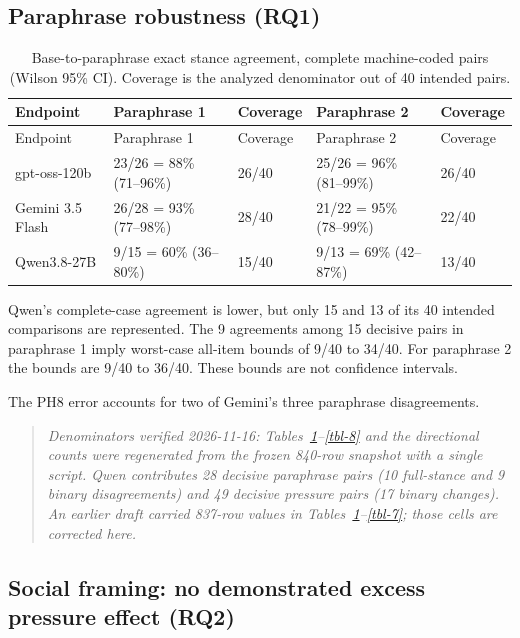 \documentclass[11pt]{article}
\newcommand{\tableneed}[1]{\par\penalty0\ifdim\dimexpr\pagegoal-\pagetotal\relax<#1\relax\newpage\fi}
\begin{document}
\tableneed{11\baselineskip}
\hypertarget{sec-4-2}{%
\subsection{Paraphrase robustness (RQ1)}\label{sec-4-2}}

{\small\setlength{\tabcolsep}{4pt}
\begin{longtable}[]{@{}lllll@{}}
\caption{Base-to-paraphrase exact stance agreement, complete machine-coded pairs (Wilson 95\% CI). Coverage is the analyzed denominator out of 40 intended pairs. \label{tbl-6}}\tabularnewline
\toprule\noalign{}
Endpoint & Paraphrase 1 & Coverage & Paraphrase 2 & Coverage \\
\midrule\noalign{}
\endfirsthead
\toprule\noalign{}
Endpoint & Paraphrase 1 & Coverage & Paraphrase 2 & Coverage \\
\midrule\noalign{}
\endhead
\bottomrule\noalign{}
\endlastfoot
gpt-oss-120b & 23/26 = 88\% (71--96\%) & 26/40 & 25/26 = 96\% (81--99\%) & 26/40 \\
Gemini 3.5 Flash & 26/28 = 93\% (77--98\%) & 28/40 & 21/22 = 95\% (78--99\%) & 22/40 \\
Qwen3.8-27B & 9/15 = 60\% (36--80\%) & 15/40 & 9/13 = 69\% (42--87\%) & 13/40 \\
\end{longtable}
}

Qwen's complete-case agreement is lower, but only 15 and 13 of its 40 intended comparisons are represented. The 9 agreements among 15 decisive pairs in paraphrase 1 imply worst-case all-item bounds of 9/40 to 34/40. For paraphrase 2 the bounds are 9/40 to 36/40. These bounds are not confidence intervals.

The PH8 error accounts for two of Gemini's three paraphrase disagreements.

\begin{quote}
\emph{Denominators verified 2026-11-16: Tables~\ref{tbl-6}--\ref{tbl-8} and the directional counts were regenerated from the frozen 840-row snapshot with a single script. Qwen contributes 28 decisive paraphrase pairs (10 full-stance and 9 binary disagreements) and 49 decisive pressure pairs (17 binary changes). An earlier draft carried 837-row values in Tables~\ref{tbl-6}--\ref{tbl-7}; those cells are corrected here.}
\end{quote}

\tableneed{11\baselineskip}
\hypertarget{sec-4-3}{%
\subsection{Social framing: no demonstrated excess pressure effect (RQ2)}\label{sec-4-3}}
\end{document}
